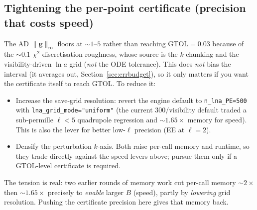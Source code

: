 \documentclass[11pt]{article}
\newcommand{\code}[1]{\texttt{\small #1}}
\newcommand{\chisq}{\chi^2}
\newcommand{\ginf}{\lVert \bm{g}\rVert_\infty}
\begin{document}
\subsection{Tightening the per-point certificate (precision that costs speed)}
The AD $\ginf$ floors at $\sim1$--$5$ rather than reaching
$\mathrm{GTOL}=0.03$ because of the $\sim0.1$ $\chisq$ discretisation
roughness, whose source is the $k$-chunking and the visibility-driven
$\ln a$ grid (\emph{not} the ODE tolerance). This does \emph{not} bias the
interval (it averages out, Section~\ref{sec:errbudget}), so it only matters
if you want the certificate itself to reach GTOL. To reduce it:
\begin{itemize}[leftmargin=1.5em,itemsep=1pt]
\item Increase the save-grid resolution: revert the engine default
to \code{n\_lna\_PE=500} with \code{lna\_grid\_mode="uniform"} (the current
$300$/visibility default traded a sub-permille $\ell<5$ quadrupole
regression and $\sim1.65\times$ memory for speed). This is also the lever
for better low-$\ell$ precision (EE at $\ell=2$).
\item Densify the perturbation $k$-axis. Both raise per-call memory and
runtime, so they trade directly against the speed levers above; pursue them
only if a GTOL-level certificate is required.
\end{itemize}
The tension is real: two earlier rounds of memory work cut per-call memory
$\sim2\times$ then $\sim1.65\times$ precisely to \emph{enable} larger $B$
(speed), partly by \emph{lowering} grid resolution. Pushing the certificate
precision here gives that memory back.
\end{document}
